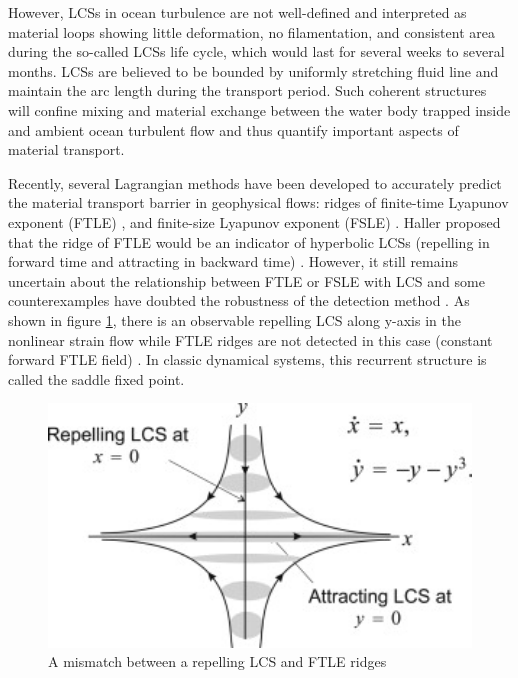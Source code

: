 However, LCSs in ocean turbulence are not well-defined and interpreted as material loops showing little deformation, no filamentation, and consistent area during the so-called LCSs life cycle, which would last for several weeks to several months. LCSs are believed to be bounded by uniformly stretching fluid line and maintain the arc length during the transport period. Such coherent structures will confine mixing and material exchange between the water body trapped inside and ambient ocean turbulent flow and thus quantify important aspects of material transport\cite{haller2015lagrangian}.

Recently, several Lagrangian methods have been developed to accurately predict the material transport barrier in geophysical flows: ridges of finite-time
Lyapunov exponent (FTLE) \cite{shadden2005definition, haller2011lagrangian}, and finite-size Lyapunov exponent (FSLE) \cite{aurell1997predictability, joseph2002relation, d2004mixing}. Haller proposed that the ridge of FTLE would be an indicator of hyperbolic LCSs (repelling in forward time and attracting in backward time) \cite{haller2001distinguished}. However, it still remains uncertain about the relationship between FTLE or FSLE with LCS and some counterexamples have doubted the robustness of the detection method \cite{haller2011variational, karrasch2013finite}. As shown in figure \ref{LCS and FTLE}, there is an observable repelling LCS along y-axis in the nonlinear strain flow while FTLE ridges are not detected in this case (constant forward FTLE field) \cite{haller2011variational}. In classic dynamical systems, this recurrent structure is called the saddle fixed point.

\begin{figure}[ht]
  \centering
  \includegraphics[width=12cm]{chapter/figure/mismatch.jpg}
  \caption
  {A mismatch between a repelling LCS and FTLE ridges\cite{haller2011variational}
  \label{LCS and FTLE}
  }
\end{figure}

